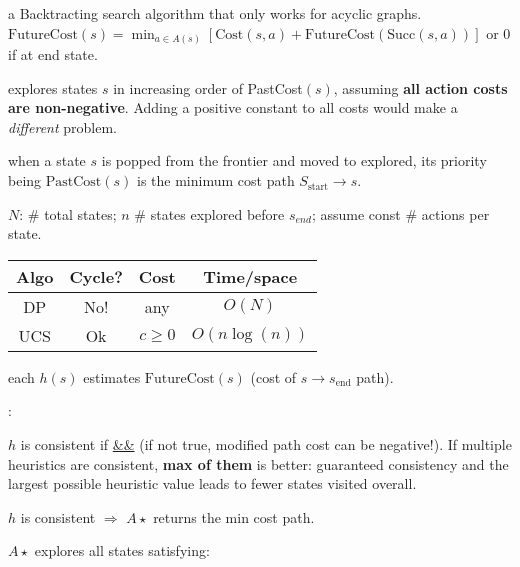  a Backtracting search algorithm that only works
for acyclic graphs.
$\text{FutureCost}(s) = \min_{a\in A(s)}\left[\text{Cost}(s,a) + \text{FutureCost}(\text{Succ}(s,a))\right]$
or $0$ if at end state.

 explores states $s$ in increasing order of
PastCost$(s)$, assuming \textbf{all action costs are non-negative}. Adding a
positive constant to all costs would make a \emph{different} problem.

 when a state $s$ is popped from the frontier and moved
to explored, its priority being $\text{PastCost}(s)$ is the minimum cost path
$S_\text{start} \rightarrow s$.

 $N$: \# total states; $n$ \# states explored before $s_{end}$;
assume const \# actions per state.

\begin{tabular}{|c|c|c|c|} 
    \hline
    \textbf{Algo} & \textbf{Cycle?} & \textbf{Cost} & \textbf{Time/space} \\
    \hline
    DP & No! & any & $O(N)$ \\ 
    \hline
    UCS & Ok & $c \ge 0$ & $O(n \log(n))$ \\
    \hline
\end{tabular}

 each $h(s)$ estimates $\text{FutureCost}(s)$ (cost of $s
\rightarrow s_{\text{end}}$ path).

 :

 $h$ is consistent if
 \underline{\&\&}
(if not true, modified path cost can be negative!).
If multiple heuristics are consistent, \textbf{max of them} is better:
guaranteed consistency and the largest possible heuristic value leads to fewer
states visited overall.

 $h$ is consistent $\Rightarrow$ $A\star$ returns the min cost path.

 $A\star$ explores all states satisfying:

